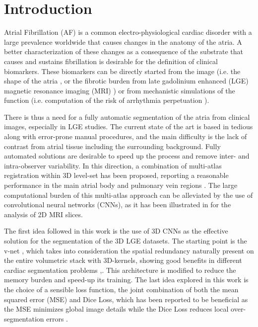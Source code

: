 \documentclass{llncs}
\begin{document}
\section{Introduction}

Atrial Fibrillation (AF) is a common electro-physiological cardiac disorder with a large prevalence worldwide \cite{Prystowsky} that causes changes in the anatomy of the atria. A better characterization of these changes as a consequence of the substrate that causes and sustains fibrillation is desirable for the definition of clinical biomarkers. These biomarkers can be directly started from the image (i.e. the shape of the atria \cite{Varela17}, or the fibrotic burden from late gadolinium enhanced (LGE) magnetic resonance imaging (MRI) \cite{Kim}) or from mechanistic simulations of the function (i.e. computation of the risk of arrhythmia perpetuation \cite{Boyle16}).

There is thus a need for a fully automatic segmentation of the atria from clinical images, especially in LGE studies. The current state of the art is based in tedious along with error-prone manual procedures, and the main difficulty is the lack of contrast from atrial tissue including the surrounding background. Fully automated solutions are desirable to speed up the process and remove inter- and intra-observer variability. In this direction, a combination of multi-atlas registration within 3D level-set has been proposed, reporting a reasonable performance in the main atrial body and pulmonary vein regions \cite{Tao}. The large computational burden of this multi-atlas approach can be alleviated by the use of convolutional neural networks (CNNs), as it has been illustrated in \cite{Aliasghar} for the analysis of 2D MRI slices.

The first idea followed in this work is the use of 3D CNNs as the effective solution for the segmentation of the 3D LGE datasets. The starting point is the v-net \cite{Fausto}, which takes into consideration the spatial redundancy naturally present on the entire volumetric stack with 3D-kernels, showing good benefits in different cardiac segmentation problems \cite{Isensee},\cite{Hinrich}. This architecture is modified to reduce the memory burden and speed-up its training. The last idea explored in this work is the choice of a sensible loss function, the joint combination of both the mean squared error (MSE) and Dice Loss, which has been reported to be beneficial as the MSE minimizes global image details while the Dice Loss reduces local over-segmentation errors \cite{Fausto}.
\end{document}
